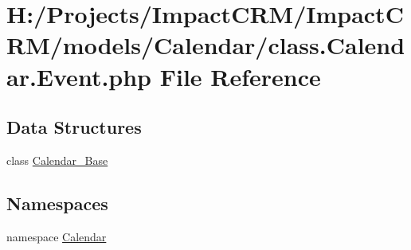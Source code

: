 \hypertarget{class_8Calendar_8Event_8php}{
\section{H:/Projects/ImpactCRM/ImpactCRM/models/Calendar/class.Calendar.Event.php File Reference}
\label{class_8Calendar_8Event_8php}
}
\subsection*{Data Structures}
\begin{DoxyCompactItemize}
\item 
class \hyperlink{classCalendar__Base}{Calendar\_\-Base}
\end{DoxyCompactItemize}
\subsection*{Namespaces}
\begin{DoxyCompactItemize}
\item 
namespace \hyperlink{namespaceCalendar}{Calendar}
\end{DoxyCompactItemize}
